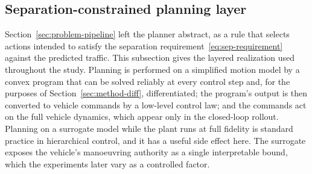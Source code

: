 \documentclass[11pt]{article}
\theoremstyle{plain}
\theoremstyle{definition}
\begin{document}
\subsection{Separation-constrained planning layer}
\label{sec:method-planner}
 
Section~\ref{sec:problem-pipeline} left the planner abstract, as a
rule that selects actions intended to satisfy the separation
requirement~\eqref{eq:sep-requirement} against the predicted traffic.
This subsection gives the layered realization used throughout the
study. Planning is performed on a simplified motion model by a convex
program that can be solved reliably at every control step and, for the
purposes of Section~\ref{sec:method-diff}, differentiated; the
program's output is then converted to vehicle commands by a low-level
control law; and the commands act on the full vehicle dynamics, which
appear only in the closed-loop rollout. Planning on a surrogate model
while the plant runs at full fidelity is standard practice in
hierarchical control, and it has a useful side effect here. The
surrogate exposes the vehicle's manoeuvring authority as a single
interpretable bound, which the experiments later vary as a controlled
factor.
 
\end{document}
